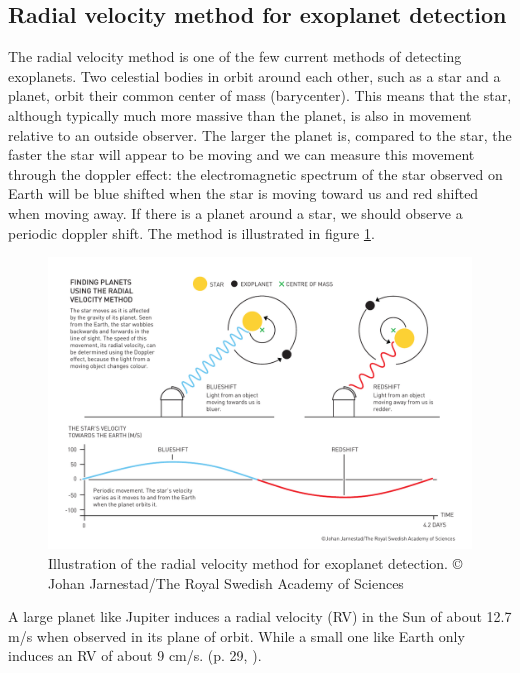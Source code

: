 
\subsection{Radial velocity method for exoplanet detection}
The radial velocity method is one of the few current methods of detecting exoplanets. Two celestial bodies in orbit around each other, such as a star and a planet, orbit their common center of mass (barycenter). This means that the star, although typically much more massive than the planet, is also in movement relative to an outside observer. The larger the planet is, compared to the star, the faster the star will appear to be moving and we can measure this movement through the doppler effect: the electromagnetic spectrum of the star observed on Earth will be blue shifted when the star is moving toward us and red shifted when moving away. If there is a planet around a star, we should observe a periodic doppler shift. The method is illustrated in figure \ref{fig:rv_method_illustration}.

\begin{figure}%
    \begin{wide}  
        \includegraphics[width=\textwidth]{figures/rv_method_illustration.pdf}
        \caption{Illustration of the radial velocity method for exoplanet detection. © Johan Jarnestad/The Royal Swedish Academy of Sciences}
        \label{fig:rv_method_illustration}
    \end{wide}
\end{figure}

A large planet like Jupiter induces a radial velocity (RV) in the Sun of about 12.7 m/s when observed in its plane of orbit. While a small one like Earth only induces an RV of about 9 cm/s. (p. 29, \cite{radial_velocity_techniques}). 

